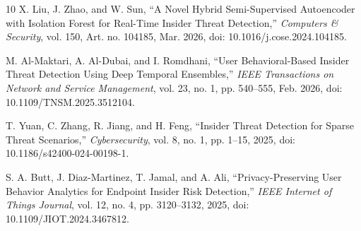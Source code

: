 \documentclass[conference]{IEEEtran}
\begin{document}
\begin{thebibliography}{10}
 X. Liu, J. Zhao, and W. Sun, ``A Novel Hybrid Semi-Supervised Autoencoder with Isolation Forest for Real-Time Insider Threat Detection,'' \textit{Computers \& Security}, vol. 150, Art. no. 104185, Mar. 2026, doi: 10.1016/j.cose.2024.104185.

 M. Al-Maktari, A. Al-Dubai, and I. Romdhani, ``User Behavioral-Based Insider Threat Detection Using Deep Temporal Ensembles,'' \textit{IEEE Transactions on Network and Service Management}, vol. 23, no. 1, pp. 540--555, Feb. 2026, doi: 10.1109/TNSM.2025.3512104.

 T. Yuan, C. Zhang, R. Jiang, and H. Feng, ``Insider Threat Detection for Sparse Threat Scenarios,'' \textit{Cybersecurity}, vol. 8, no. 1, pp. 1--15, 2025, doi: 10.1186/s42400-024-00198-1.

 S. A. Butt, J. Diaz-Martinez, T. Jamal, and A. Ali, ``Privacy-Preserving User Behavior Analytics for Endpoint Insider Risk Detection,'' \textit{IEEE Internet of Things Journal}, vol. 12, no. 4, pp. 3120--3132, 2025, doi: 10.1109/JIOT.2024.3467812.

\end{thebibliography}
\end{document}
